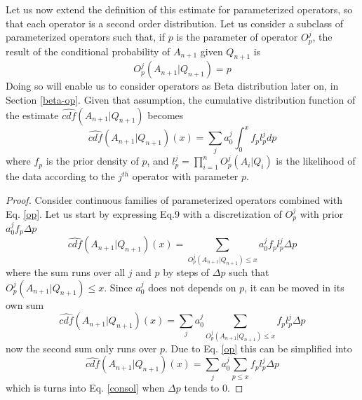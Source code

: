 \documentclass[runningheads]{llncs}
\begin{document}
Let us now extend the definition of this estimate for parameterized
operators, so that each operator is a second order distribution. Let
us consider a subclass of parameterized operators such that, if $p$ is
the parameter of operator $O^j_p$, the result of the conditional
probability of $A_{n+1}$ given $Q_{n+1}$ is
\begin{equation}
  \label{op}
O^j_p(A_{n+1}|Q_{n+1})=p
\end{equation}
Doing so will enable us to consider operators as Beta distribution
later on, in Section \ref{beta-op}.
Given that assumption, the cumulative distribution function of the
estimate $\hat{cdf}(A_{n+1}|Q_{n+1})$ becomes
\begin{equation}
  \label{consol}
  \hat{cdf}(A_{n+1}|Q_{n+1})(x) = \sum_j a_0^j \int_0^x f_p l_p^j dp
\end{equation}
where $f_p$ is the prior density of $p$, and
$l_p^j= \prod_{i=1}^{n} O^j_p(A_i|Q_i)$ is the likelihood of the data
according to the $j^{th}$ operator with parameter $p$.
\begin{proof}
  Consider continuous families of parameterized operators combined
  with Eq. \ref{op}. Let us start by expressing Eq.9 with a
  discretization of $O^j_p$ with prior $a^j_0 f_p \Delta p$
\begin{equation}
  \hat{cdf}(A_{n+1}|Q_{n+1})(x) = \sum_{O^j_p(A_{n+1}|Q_{n+1})\le x}
  a_0^j f_p l_p^j \Delta p
\end{equation}
where the sum runs over all $j$ and $p$ by steps of $\Delta p$ such
that $O^j_p(A_{n+1}|Q_{n+1})\le x$. Since $a_0^j$ does not depends on
$p$, it can be moved in its own sum
\begin{equation}
  \hat{cdf}(A_{n+1}|Q_{n+1})(x) = \sum_j a_0^j
  \sum_{O^j_p(A_{n+1}|Q_{n+1})\le x} f_p l_p^j \Delta p
\end{equation}
now the second sum only runs over $p$. Due to Eq. \ref{op} this can be
simplified into
\begin{equation}
  \hat{cdf}(A_{n+1}|Q_{n+1})(x) = \sum_j a_0^j \sum_{p\le x} f_p l_p^j
  \Delta p
\end{equation}
which is turns into Eq. \ref{consol} when $\Delta p$ tends to 0.
\end{proof}
\end{document}
